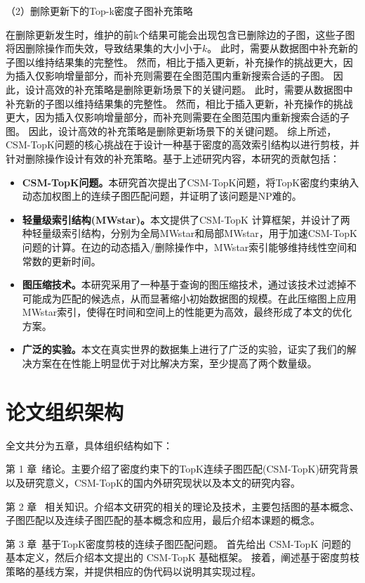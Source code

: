 （2）删除更新下的Top-k密度子图补充策略

   在删除更新发生时，维护的前k个结果可能会出现包含已删除边的子图，这些子图将因删除操作而失效，导致结果集的大小小于$k$。
   此时，需要从数据图中补充新的子图以维持结果集的完整性。
   然而，相比于插入更新，补充操作的挑战更大，因为插入仅影响增量部分，而补充则需要在全图范围内重新搜索合适的子图。
   因此，设计高效的补充策略是删除更新场景下的关键问题。
   此时，需要从数据图中补充新的子图以维持结果集的完整性。
   然而，相比于插入更新，补充操作的挑战更大，因为插入仅影响增量部分，而补充则需要在全图范围内重新搜索合适的子图。
   因此，设计高效的补充策略是删除更新场景下的关键问题。
   综上所述，CSM-TopK问题的核心挑战在于设计一种基于密度的高效索引结构以进行剪枝，并针对删除操作设计有效的补充策略。基于上述研究内容，本研究的贡献包括：
\begin{itemize}[label={\textbullet}]
    \item \textbf{CSM-TopK问题。}本研究首次提出了CSM-TopK问题，将TopK密度约束纳入动态加权图上的连续子图匹配问题，并证明了该问题是NP难的。
    \item \textbf{轻量级索引结构(MWstar)。}本文提供了CSM-TopK 计算框架，并设计了两种轻量级索引结构，分别为全局MWstar和局部MWstar，用于加速CSM-TopK问题的计算。在边的动态插入/删除操作中，MWstar索引能够维持线性空间和常数的更新时间。
    \item \textbf{图压缩技术。}本研究采用了一种基于查询的图压缩技术，通过该技术过滤掉不可能成为匹配的候选点，从而显著缩小初始数据图的规模。在此压缩图上应用 MWstar索引，使得在时间和空间上的性能更为高效，最终形成了本文的优化方案。
    \item \textbf{广泛的实验。}本文在真实世界的数据集上进行了广泛的实验，证实了我们的解决方案在在性能上明显优于对比解决方案，至少提高了两个数量级。
  \end{itemize}
\section{论文组织架构}
全文共分为五章，具体组织结构如下：

第 1 章\ 绪论。主要介绍了密度约束下的TopK连续子图匹配(CSM-TopK)研究背景以及研究意义，CSM-TopK的国内外研究现状以及本文的研究内容。

第 2 章 \ 相关知识。介绍本文研究的相关的理论及技术，主要包括图的基本概念、子图匹配以及连续子图匹配的基本概念和应用，最后介绍本课题的概念。

第 3 章\ 基于TopK密度剪枝的连续子图匹配问题。
首先给出 CSM-TopK 问题的基本定义，然后介绍本文提出的 CSM-TopK 基础框架。
接着，阐述基于密度剪枝策略的基线方案，并提供相应的伪代码以说明其实现过程。

